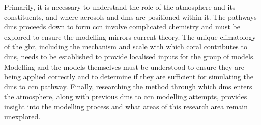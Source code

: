 
Primarily, it is necessary to understand the role of the atmosphere and its constituents, and where aerosols and \gls{dms} are positioned within it. The pathways \gls{dms} proceeds down to form \gls{ccn} involve complicated chemistry \citep{barnes:2006ug} and must be explored to ensure the modelling mirrors current theory. The unique climatology of the \gls{gbr}, including the mechanism and scale with which coral contributes to \gls{dms}, needs to be established to provide localised inputs for the group of models. Modelling and the models themselves must be understood to ensure they are being applied correctly and to determine if they are sufficient for simulating the \gls{dms} to \gls{ccn} pathway. Finally, researching the method through which \gls{dms} enters the atmosphere, along with previous \gls{dms} to \gls{ccn} modelling attempts, provides insight into the modelling process and what areas of this research area remain unexplored.



